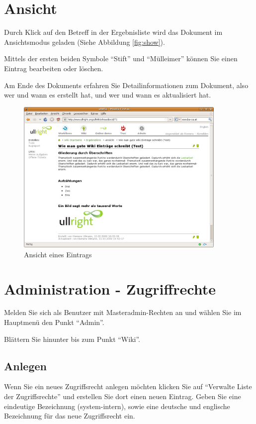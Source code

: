 \documentclass[article, a4paper, oneside, 11pt]{memoir}
\begin{document}
\section{Ansicht}
Durch Klick auf den Betreff in der Ergebnisliste wird das Dokument im Ansichtsmodus geladen (Siehe Abbildung \vref{fig:show}).

Mittels der ersten beiden Symbole "`Stift"' und "`Mülleimer"' können Sie einen Eintrag bearbeiten oder löschen.

Am Ende des Dokuments erfahren Sie Detailinformationen zum Dokument, also wer und wann es erstellt hat, und wer und wann es aktualisiert hat.

\begin{figure}[htp]
\centering
\includegraphics[width=0.9\textwidth]{show}
\caption{Ansicht eines Eintrags}
\label{fig:show}
\end{figure}




\section{Administration - Zugriffrechte}
Melden Sie sich als Benutzer mit Masteradmin-Rechten an und wählen Sie im Hauptmenü den Punkt "`Admin"'.

Blättern Sie hinunter bis zum Punkt "`Wiki"'.

\subsection{Anlegen}
Wenn Sie ein neues Zugriffsrecht anlegen möchten klicken Sie auf "`Verwalte Liste der Zugriffsrechte"' und erstellen Sie dort einen neuen Eintrag. Geben Sie eine eindeutige Bezeichnung (system-intern), sowie eine deutsche und englische Bezeichnung für das neue Zugriffsrecht ein.
\end{document}
